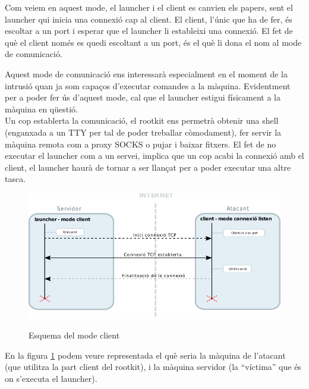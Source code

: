 Com veiem en aquest mode, el launcher i el client es canvien els papers, sent el launcher qui inicia una connexió 
cap al client. El client, l'únic que ha de fer, és escoltar a un port i esperar que el launcher li estableixi
una connexió. El fet de què el client només es quedi escoltant a un port, és el què li dona el nom al mode de
comunicació.

Aquest mode de comunicació ens interessarà especialment en el moment de la intrusió quan ja som capaços d'executar
comandes a la màquina. Evidentment per a poder fer ús d'aquest mode, cal que el launcher estigui físicament
a la màquina en qüestió. \\

Un cop establerta la comunicació, el rootkit ens permetrà obtenir una shell (enganxada a un TTY per tal de poder treballar 
còmodament), fer servir la màquina remota com a proxy SOCKS o pujar i baixar fitxers. El fet de no executar el 
launcher com a un servei, implica que un cop acabi la connexió amb el client, el launcher haurà de tornar a ser llançat 
per a poder executar una altre tasca. \\

\begin{figure}[htp]
    \centering
    \includegraphics[scale=1.2,keepaspectratio]{diagrames/solutionDesignClientMode.pdf} \\
    \caption{Esquema del mode client}
    \label{fig:modeClient}
\end{figure}

En la figura \ref{fig:modeClient} podem veure representada el què seria la màquina de l'atacant (que utilitza la part client del rootkit),
i la màquina servidor (la ``víctima'' que és on s'executa el launcher).

